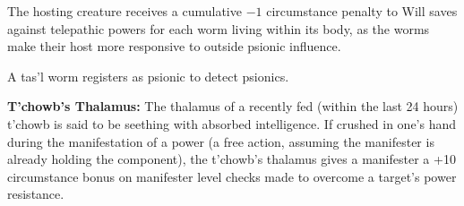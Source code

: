 The hosting creature receives a cumulative $-1$ circumstance penalty to Will saves against telepathic powers for each worm living within its body, as the worms make their host more responsive to outside psionic influence.

A tas'l worm registers as psionic to detect psionics.

\textbf{T'chowb's Thalamus:} The thalamus of a recently fed (within the last 24 hours) t'chowb is said to be seething with absorbed intelligence. If crushed in one's hand during the manifestation of a power (a free action, assuming the manifester is already holding the component), the t'chowb's thalamus gives a manifester a +10 circumstance bonus on manifester level checks made to overcome a target's power resistance.